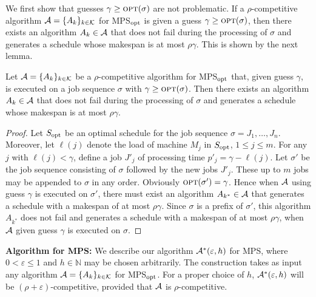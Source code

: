 \documentclass{llncs}
\newcommand{\OPT}{\text{{\sc opt}}}
\newcommand{\opt}{\OPT}
\newcommand{\MPS}{{\rm MPS}}
\newcommand{\MPSO}{{\rm MPS$_{\rm opt}$}}
\newcommand{\eps}{\varepsilon}
\begin{document}
We first show that guesses $\gamma \geq\opt(\sigma)$ are not problematic. If a $\rho$-competitive 
algorithm ${\cal A} = \{A_k\}_{k\in {\cal K}}$ for MPS$_{\rm opt}$ is given a guess $\gamma \geq \opt(\sigma)$, 
then there exists an algorithm $A_k\in {\cal A}$ that does not fail during 
the processing of $\sigma$ and generates a schedule whose makespan is at most $\rho\gamma$. This is shown by the next lemma.


\begin{lemma}\label{lem:guess1}
Let ${\cal A} = \{A_k\}_{k\in {\cal K}}$ be a $\rho$-competitive algorithm for MPS$_{\rm opt}$ that, given guess
$\gamma$, is executed on a job sequence $\sigma$ with $\gamma \geq \opt(\sigma)$. Then there exists an
algorithm $A_k\in {\cal A}$ that does not fail during the processing of $\sigma$ and generates a schedule
whose makespan is at most $\rho\gamma$.
\end{lemma}
\begin{proof}
Let $S_{\rm opt}$ be an optimal schedule for the job sequence \linebreak $\sigma = J_1, \ldots, J_n$. Moreover, let $\ell(j)$ 
denote the load of machine $M_j$ in $S_{\rm opt}$, $1\leq j\leq m$. For any $j$ with $\ell(j) <\gamma$, define a
job $J'_j$ of processing time $p'_j = \gamma-\ell(j)$. Let $\sigma'$ be the job sequence consisting
of $\sigma$ followed by the new jobs $J'_j$. These up to $m$ jobs may be appended to $\sigma$ in any order.
Obviously $\opt(\sigma') = \gamma$. Hence when ${\cal A\/}$ using guess $\gamma$ is executed on $\sigma'$,
there must exist an algorithm $A_{k^*}\in {\cal A}$ that generates a schedule with a makespan of at most 
$\rho\gamma$. Since $\sigma$ is a prefix of $\sigma'$, this algorithm $A_{k^*}$ does not fail and generates
a schedule with a makespan of at most $\rho\gamma$, when ${\cal A}$ given guess $\gamma$ is executed on
$\sigma$. \hspace*{\fill}{$\Box$}
\end{proof}



\vspace*{0.1cm}

{\bf Algorithm for MPS:} We describe our algorithm ${\cal A^*}(\eps,h)$ for \MPS, where 
$0<\eps\leq 1$ and $h\in \mathbb{N}$ may be
chosen arbitrarily. The construction takes as input any algorithm ${\cal A} = \{A_k\}_{k\in {\cal K}}$
for \MPSO. For a proper choice of $h$, ${\cal A^*}(\eps,h)$ will be $(\rho+\eps)$-competitive, provided
that ${\cal A}$ is $\rho$-competitive. 
\end{document}
